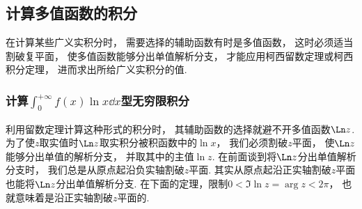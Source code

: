 \subsection{计算多值函数的积分}
在计算某些广义实积分时，
需要选择的辅助函数有时是多值函数，
这时必须适当割破复平面，
使多值函数能够分出单值解析分支，
才能应用柯西留数定理或柯西积分定理，
进而求出所给广义实积分的值.

\subsubsection{计算\texorpdfstring{\(\int_0^{+\infty} f(x) \ln x \dd{x}\)型}{含有对数函数的}无穷限积分}
利用留数定理计算这种形式的积分时，
其辅助函数的选择就避不开多值函数\(\Ln z\).
为了使\(z\)取实值时\(\Ln z\)取实积分被积函数中的\(\ln x\)，
我们必须割破\(z\)平面，
使\(\Ln z\)能够分出单值的解析分支，
并取其中的主值\(\ln z\).
在前面谈到将\(\Ln z\)分出单值解析分支时，
我们总是从原点起沿负实轴割破\(z\)平面.
其实从原点起沿正实轴割破\(z\)平面也能将\(\Ln z\)分出单值解析分支.
在下面的定理，限制\(0 < \Im \ln z = \arg z < 2\pi\)，
也就意味着是沿正实轴割破\(z\)平面的.

